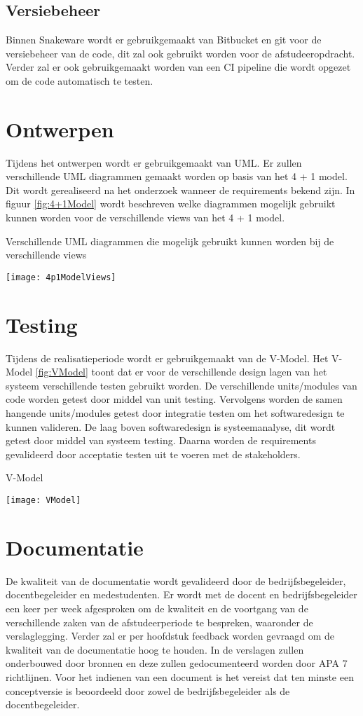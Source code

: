 \subsection{Versiebeheer}
Binnen Snakeware wordt er gebruikgemaakt van Bitbucket en git voor de versiebeheer van de code, dit zal ook gebruikt worden voor de afstudeeropdracht.
Verder zal er ook gebruikgemaakt worden van een CI pipeline die wordt opgezet om de code automatisch te testen.
\section{Ontwerpen}
\label{sec:Ontwerpen}
Tijdens het ontwerpen wordt er gebruikgemaakt van UML.
Er zullen verschillende UML diagrammen gemaakt worden op basis van het 4 + 1 model.
Dit wordt gerealiseerd na het onderzoek wanneer de requirements bekend zijn.
In figuur \ref{fig:4+1Model} wordt beschreven welke diagrammen mogelijk gebruikt kunnen worden voor de verschillende views van het 4 + 1 model.
\begin{graphic}
    \captionsetup{type=figure}
    \caption{Verschillende UML diagrammen die mogelijk gebruikt kunnen worden bij de verschillende views \Parencite{4p1ModelViews}}
    \texttt{[image: 4p1ModelViews]}
    \label{fig:4+1Model}
\end{graphic}
\section{Testing}
\label{sec:Testing}
Tijdens de realisatieperiode wordt er gebruikgemaakt van de V-Model.
Het V-Model \ref{fig:VModel} toont dat er voor de verschillende design lagen van het systeem verschillende testen gebruikt worden.
De verschillende units/modules van code worden getest door middel van unit testing.
Vervolgens worden de samen hangende units/modules getest door integratie testen om het softwaredesign te kunnen valideren.
De laag boven softwaredesign is systeemanalyse, dit wordt getest door middel van systeem testing.
Daarna worden de requirements gevalideerd door acceptatie testen uit te voeren met de stakeholders.
\begin{graphic}
    \captionsetup{type=figure}
    \caption{V-Model \Parencite{VModel}}
    \texttt{[image: VModel]}
    \label{fig:VModel}
\end{graphic}
\section{Documentatie}
De kwaliteit van de documentatie wordt gevalideerd door de bedrijfsbegeleider, docentbegeleider en medestudenten.
Er wordt met de docent en bedrijfsbegeleider een keer per week afgesproken om de kwaliteit en de voortgang van de verschillende zaken van de afstudeerperiode te bespreken, waaronder de verslaglegging.
Verder zal er per hoofdstuk feedback worden gevraagd om de kwaliteit van de documentatie hoog te houden.
In de verslagen zullen onderbouwed door bronnen en deze zullen gedocumenteerd worden door APA 7 richtlijnen.
Voor het indienen van een document is het vereist dat ten minste een conceptversie is beoordeeld door zowel de bedrijfsbegeleider als de docentbegeleider.
